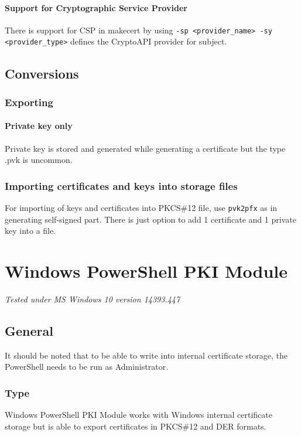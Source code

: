 \documentclass[10pt, a4paper]{report}
\begin{document}
    \subsubsection{Support for Cryptographic Service Provider}
There is support for CSP in makecert by using \verb+-sp <provider_name> -sy <provider_type>+ defines the CryptoAPI provider for subject.
\section{Conversions}

  \subsection{Exporting}
  
    \subsubsection{Private key only}
Private key is stored and generated while generating a certificate but the type .pvk is uncommon.

  \subsection{Importing certificates and keys into storage files}
For importing of keys and certificates into PKCS\#12 file, use \verb+pvk2pfx+ as in generating self-signed part. There is just option to add 1 certificate and 1 private key into a file.


\chapter{Windows PowerShell PKI Module}

\textit{Tested under MS Windows 10 version 14393.447}

\section{General}

It should be noted that to be able to write into internal certificate storage, the PowerShell needs to be run as Administrator.
  \subsection{Type}
Windows PowerShell PKI Module works with Windows internal certificate storage but is able to export certificates in PKCS\#12 and DER formats. 
\end{document}
